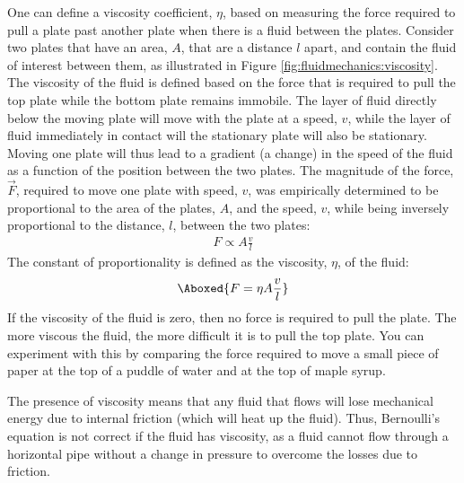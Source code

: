 {{One can define a viscosity coefficient, $\eta$, based on measuring the force required to pull a plate past another plate when there is a fluid between the plates. Consider two plates that have an area, $A$, that are a distance $l$ apart, and contain the fluid of interest between them, as illustrated in Figure \ref{fig:fluidmechanics:viscosity}.
The viscosity of the fluid is defined based on the force that is required to pull the top plate while the bottom plate remains immobile. The layer of fluid directly below the moving plate will move with the plate at a speed, $v$, while the layer of fluid immediately in contact will the stationary plate will also be stationary. Moving one plate will thus lead to a gradient (a change) in the speed of the fluid as a function of the position between the two plates. The magnitude of the force, $\vec F$,  required to move one plate with speed, $v$, was empirically determined to be proportional to the area of the plates, $A$, and the speed, $v$, while being inversely proportional to the distance, $l$, between the two plates:
\begin{align*}
F \propto A\frac{v}{l}
\end{align*}
The constant of proportionality is defined as the viscosity, $\eta$, of the fluid:
\begin{align}
\Aboxed{F = \eta A\frac{v}{l}}
\end{align}
If the viscosity of the fluid is zero, then no force is required to pull the plate. The more viscous the fluid, the more difficult it is to pull the top plate. You can experiment with this by comparing the force required to move a small piece of paper at the top of a puddle of water and at the top of maple syrup.

The presence of viscosity means that any fluid that flows will lose mechanical energy due to internal friction (which will heat up the fluid). Thus, Bernoulli's equation is not correct if the fluid has viscosity, as a fluid cannot flow through a horizontal pipe without a change in pressure to overcome the losses due to friction.

}}
